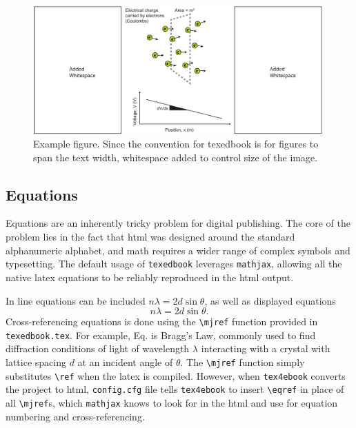 \documentclass{article}
\begin{document}
\begin{figure}[t]
    \centering
    \includegraphics[width=0.99\textwidth, keepaspectratio]{figures/fig.pdf}
    \caption{Example figure. Since the convention for texedbook is for figures to span the text width, whitespace added to control size of the image.}
    \label{fig:example}
\end{figure}



\subsection{Equations} \label{sec:equations}
Equations are an inherently tricky problem for digital publishing. The core of the problem lies in the fact that html was designed around the standard alphanumeric alphabet, and math requires a wider range of complex symbols and typesetting. The default usage of \verb'texedbook' leverages \verb'mathjax', allowing all the native latex equations to be reliably reproduced in the html output.

In line equations can be included $n\lambda=2d \sin \theta$, as well as displayed equations 
\begin{equation}
    n\lambda=2d \sin \theta.
    \label{eq:braggslaw}
\end{equation}
Cross-referencing equations is done using the \verb'\mjref' function provided in \verb'texedbook.tex'. For example, Eq.  is Bragg's Law, commonly used to find diffraction conditions of light of wavelength $\lambda$ interacting with a crystal with lattice spacing $d$ at an incident angle of $\theta$. The \verb'\mjref' function simply substitutes \verb'\ref' when the latex is compiled. However, when \verb'tex4ebook' converts the project to html, \verb'config.cfg' file tells \verb'tex4ebook' to insert \verb'\eqref' in place of all \verb'\mjref's, which \verb'mathjax' knows to look for in the html and use for equation numbering and cross-referencing. 
\end{document}
